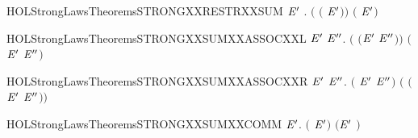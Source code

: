 \begin{SaveVerbatim}{HOLStrongLawsTheoremsSTRONGXXRESTRXXSUM}
\HOLTokenTurnstile{} \HOLSymConst{\HOLTokenForall{}} \ensuremath{\HOLBoundVar{E}\sp{\prime}} .  \ensuremath{(}  \ensuremath{(} \HOLSymConst{\ensuremath{+}} \ensuremath{\HOLBoundVar{E}\sp{\prime}}\ensuremath{)}\ensuremath{)} \ensuremath{(}   \HOLSymConst{\ensuremath{+}}   \ensuremath{\HOLBoundVar{E}\sp{\prime}}\ensuremath{)}
\end{SaveVerbatim}
\newcommand{\HOLStrongLawsTheoremsSTRONGXXRESTRXXSUM}{\UseVerbatim{HOLStrongLawsTheoremsSTRONGXXRESTRXXSUM}}
\begin{SaveVerbatim}{HOLStrongLawsTheoremsSTRONGXXSUMXXASSOCXXL}
\HOLTokenTurnstile{} \HOLSymConst{\HOLTokenForall{}} \ensuremath{\HOLBoundVar{E}\sp{\prime}} \ensuremath{\HOLBoundVar{E}\sp{\prime\prime}}.  \ensuremath{(} \HOLSymConst{\ensuremath{+}} \ensuremath{(}\ensuremath{\HOLBoundVar{E}\sp{\prime}} \HOLSymConst{\ensuremath{+}} \ensuremath{\HOLBoundVar{E}\sp{\prime\prime}}\ensuremath{)}\ensuremath{)} \ensuremath{(} \HOLSymConst{\ensuremath{+}} \ensuremath{\HOLBoundVar{E}\sp{\prime}} \HOLSymConst{\ensuremath{+}} \ensuremath{\HOLBoundVar{E}\sp{\prime\prime}}\ensuremath{)}
\end{SaveVerbatim}
\newcommand{\HOLStrongLawsTheoremsSTRONGXXSUMXXASSOCXXL}{\UseVerbatim{HOLStrongLawsTheoremsSTRONGXXSUMXXASSOCXXL}}
\begin{SaveVerbatim}{HOLStrongLawsTheoremsSTRONGXXSUMXXASSOCXXR}
\HOLTokenTurnstile{} \HOLSymConst{\HOLTokenForall{}} \ensuremath{\HOLBoundVar{E}\sp{\prime}} \ensuremath{\HOLBoundVar{E}\sp{\prime\prime}}.  \ensuremath{(} \HOLSymConst{\ensuremath{+}} \ensuremath{\HOLBoundVar{E}\sp{\prime}} \HOLSymConst{\ensuremath{+}} \ensuremath{\HOLBoundVar{E}\sp{\prime\prime}}\ensuremath{)} \ensuremath{(} \HOLSymConst{\ensuremath{+}} \ensuremath{(}\ensuremath{\HOLBoundVar{E}\sp{\prime}} \HOLSymConst{\ensuremath{+}} \ensuremath{\HOLBoundVar{E}\sp{\prime\prime}}\ensuremath{)}\ensuremath{)}
\end{SaveVerbatim}
\newcommand{\HOLStrongLawsTheoremsSTRONGXXSUMXXASSOCXXR}{\UseVerbatim{HOLStrongLawsTheoremsSTRONGXXSUMXXASSOCXXR}}
\begin{SaveVerbatim}{HOLStrongLawsTheoremsSTRONGXXSUMXXCOMM}
\HOLTokenTurnstile{} \HOLSymConst{\HOLTokenForall{}} \ensuremath{\HOLBoundVar{E}\sp{\prime}}.  \ensuremath{(} \HOLSymConst{\ensuremath{+}} \ensuremath{\HOLBoundVar{E}\sp{\prime}}\ensuremath{)} \ensuremath{(}\ensuremath{\HOLBoundVar{E}\sp{\prime}} \HOLSymConst{\ensuremath{+}} \ensuremath{)}
\end{SaveVerbatim}
